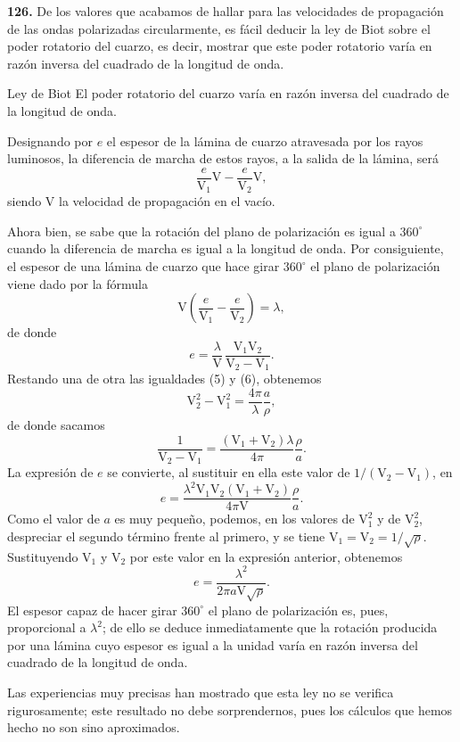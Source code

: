 \noindent\textbf{126.} De los valores que acabamos de hallar para las
velocidades de propagación de las ondas polarizadas circularmente, es fácil
deducir la ley de Biot sobre el poder rotatorio del cuarzo, es decir,
mostrar que este poder rotatorio varía en razón inversa del cuadrado de la
longitud de onda.

\begin{enunciado}{Ley de Biot}
El poder rotatorio del cuarzo varía en razón inversa del cuadrado de la
longitud de onda.
\end{enunciado}

Designando por $e$ el espesor de la lámina de cuarzo atravesada por los
rayos luminosos, la diferencia de marcha de estos rayos, a la salida de la
lámina, será
\[
\frac{e}{\mathrm V_1}\mathrm V-\frac{e}{\mathrm V_2}\mathrm V,
\]
siendo $\mathrm V$ la velocidad de propagación en el vacío.

Ahora bien, se sabe que la rotación del plano de polarización es igual a
$360^{\circ}$ cuando la diferencia de marcha es igual a la longitud de onda. Por
consiguiente, el espesor de una lámina de cuarzo que hace girar $360^{\circ}$ el
plano de polarización viene dado por la fórmula
\[
\mathrm V\left(\frac{e}{\mathrm V_1}-\frac{e}{\mathrm V_2}\right)=\lambda,
\]
de donde
\[
e=\frac{\lambda}{\mathrm V}\,\frac{\mathrm V_1\mathrm V_2}{\mathrm V_2-\mathrm V_1}.
\]
Restando una de otra las igualdades (5) y (6), obtenemos
\[
\mathrm V_2^2-\mathrm V_1^2=\frac{4\pi}{\lambda}\frac{a}{\rho},
\]
de donde sacamos
\[
\frac{1}{\mathrm V_2-\mathrm V_1}=\frac{(\mathrm V_1+\mathrm V_2)\lambda}{4\pi}\frac{\rho}{a}.
\]
La expresión de $e$ se convierte, al sustituir en ella este valor de
$1/(\mathrm V_2-\mathrm V_1)$, en
\[
e=\frac{\lambda^2\mathrm V_1\mathrm V_2(\mathrm V_1+\mathrm V_2)}{4\pi\mathrm V}\frac{\rho}{a}.
\]
Como el valor de $a$ es muy pequeño, podemos, en los valores de
$\mathrm V_1^2$ y de $\mathrm V_2^2$, despreciar el segundo término frente
al primero, y se tiene $\mathrm V_1=\mathrm V_2=1/\sqrt{\rho}$.
Sustituyendo $\mathrm V_1$ y $\mathrm V_2$ por este valor en la expresión
anterior, obtenemos
\[
e=\frac{\lambda^2}{2\pi a\mathrm V\sqrt\rho}.
\]
El espesor capaz de hacer girar $360^{\circ}$ el plano de polarización es, pues,
proporcional a $\lambda^2$; de ello se deduce inmediatamente que la
rotación producida por una lámina cuyo espesor es igual a la unidad varía
en razón inversa del cuadrado de la longitud de onda.

Las experiencias muy precisas han mostrado que esta ley no se verifica
rigurosamente; este resultado no debe sorprendernos, pues los cálculos que
hemos hecho no son sino aproximados.

